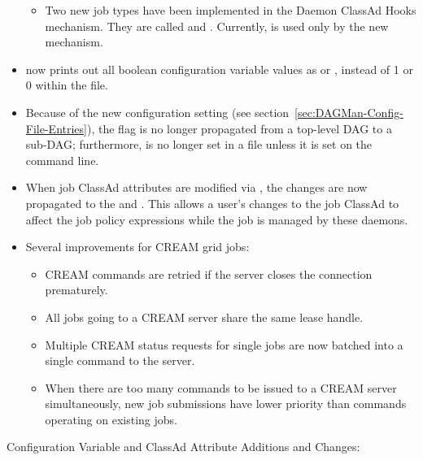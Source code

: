 \begin{itemize}
\begin{itemize}
  \item Two new job types have been implemented in the Daemon ClassAd
    Hooks mechanism.  They are called  and .
    Currently,  is used only by the new  
    mechanism.
  \end{itemize}

\item {} now prints  out all boolean configuration
variable values as  or ,
instead of 1 or 0 within the  file.

\item Because of the new  configuration setting
(see section~\ref{sec:DAGMan-Config-File-Entries}),
the  flag is no longer propagated from a top-level DAG to a
sub-DAG; furthermore,  is no longer set in a
 file unless it is set on the 
command line.

\item When job ClassAd attributes are modified via , 
the changes are now propagated to the  and .
This allows a user's changes to the job ClassAd to affect the job policy 
expressions while the job is managed by these daemons.

\item Several improvements for CREAM grid jobs:
  \begin{itemize}
  \item CREAM commands are retried if the server closes the connection
    prematurely.
  \item All jobs going to a CREAM server share the same lease handle.
  \item Multiple CREAM status requests for single jobs are now batched
    into a single command to the server.
  \item When there are too many commands to be issued to a CREAM server
    simultaneously, new job submissions have lower priority than commands
    operating on existing jobs.
  \end{itemize}

\end{itemize}

\noindent Configuration Variable and ClassAd Attribute Additions and Changes:

